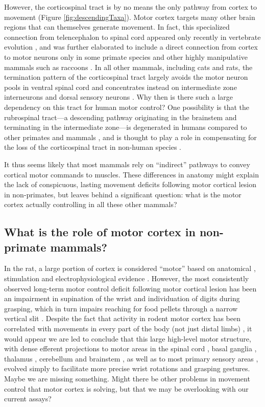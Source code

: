 However, the corticospinal tract is by no means the only pathway from cortex to movement (Figure \ref{fig:descendingTaxa}). Motor cortex targets many other brain regions that can themselves generate movement. In fact, this specialized connection from telencephalon to spinal cord appeared only recently in vertebrate evolution \citep{TenDonkelaar2009}, and was further elaborated to include a direct connection from cortex to motor neurons only in some primate species and other highly manipulative mammals such as raccoons \citep{Heffner1983}. In all other mammals, including cats and rats, the termination pattern of the corticospinal tract largely avoids the motor neuron pools in ventral spinal cord and concentrates instead on intermediate zone interneurons and dorsal sensory neurons \citep{Kuypers1981,Yang2003}. Why then is there such a large dependency on this tract for human motor control? One possibility is that the rubrospinal tract---a descending pathway originating in the brainstem and terminating in the intermediate zone---is degenerated in humans compared to other primates and mammals \citep{Nathan1955,Nathan1982}, and is thought to play a role in compensating for the loss of the corticospinal tract in non-human species \citep{Lawrence1968a,Zaaimi2012}.

It thus seems likely that most mammals rely on ``indirect'' pathways to convey cortical motor commands to muscles. These differences in anatomy might explain the lack of conspicuous, lasting movement deficits following motor cortical lesion in non-primates, but leaves behind a significant question: what is the motor cortex actually controlling in all these other mammals?

\subsection{What is the role of motor cortex in non-primate mammals?}

In the rat, a large portion of cortex is considered ``motor'' based on anatomical \citep{Donoghue1982}, stimulation \citep{Donoghue1982,Neafsey1986} and electrophysiological evidence \citep{Hyland1998}. However, the most consistently observed long-term motor control deficit following motor cortical lesion has been an impairment in supination of the wrist and individuation of digits during grasping, which in turn impairs reaching for food pellets through a narrow vertical slit \citep{Whishaw1991,Alaverdashvili2008a}. Despite the fact that activity in rodent motor cortex has been correlated with movements in every part of the body (not just distal limbs) \citep{Hill2011,Erlich2011}, it would appear we are led to conclude that this large high-level motor structure, with dense efferent projections to motor areas in the spinal cord \citep{Kuypers1981}, basal ganglia \citep{Turner2000,Wu2009}, thalamus \citep{Lee2008}, cerebellum \citep{Baker2001} and brainstem \citep{Jarratt1999}, as well as to most primary sensory areas \citep{Petreanu2012,Schneider2014}, evolved simply to facilitate more precise wrist rotations and grasping gestures. Maybe we are missing something. Might there be other problems in movement control that motor cortex is solving, but that we may be overlooking with our current assays?

